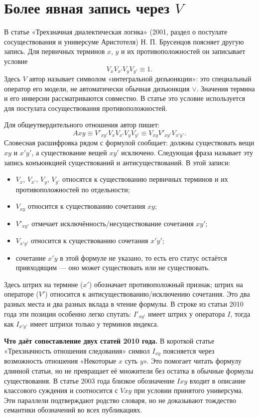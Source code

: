 \documentclass[12pt,a4paper]{article}
\begin{document}
\section{Более явная запись через $V$}

В статье «Трехзначная диалектическая логика» (2001, раздел о постулате сосуществования и универсуме Аристотеля) Н. П. Брусенцов поясняет другую запись. Для первичных терминов $x$, $y$ и их противоположностей он записывает условие
\[
V_x V_{x'} V_y V_{y'} \equiv 1.
\]
Здесь $V$ автор называет символом «интегральной дизъюнкции»: это специальный оператор его модели, не автоматически обычная дизъюнкция $\lor$. Значения термина и его инверсии рассматриваются совместно. В статье это условие используется для постулата сосуществования противоположностей.

Для общеутвердительного отношения автор пишет:
\[
Axy \equiv V'_{xy'} V_x V_{x'} V_y V_{y'}
\equiv V_{xy} V'_{xy'} V_{x'y'}.
\]
Словесная расшифровка рядом с формулой сообщает: должны существовать вещи $xy$ и $x'y'$, а существование вещей $xy'$ исключено. Следующая фраза называет эту запись конъюнкцией существований и антисуществований. В этой записи:

\begin{itemize}
\item $V_x$, $V_{x'}$, $V_y$, $V_{y'}$ относятся к существованию первичных терминов и их противоположностей по отдельности;
\item $V_{xy}$ относится к существованию сочетания $xy$;
\item $V'_{xy'}$ отмечает исключённость/несуществование сочетания $xy'$;
\item $V_{x'y'}$ относится к существованию сочетания $x'y'$;
\item сочетание $x'y$ в этой формуле не указано, то есть его статус остаётся привходящим — оно может существовать или не существовать.
\end{itemize}

Здесь штрих на термине ($x'$) обозначает противоположный признак; штрих на операторе ($V'$) относится к антисуществованию/исключению сочетания. Это два разных места и два разных вклада в чтение формулы. В строке из статьи 2010 года эти позиции особенно легко спутать: $I'_{xy'}$ имеет штрих у оператора $I$, тогда как $I_{x'y'}$ имеет штрихи только у терминов индекса.

\textbf{Что даёт сопоставление двух статей 2010 года.} В короткой статье «Трехзначность отношения следования» символ $I_{xy}$ поясняется через возможность отношения «Некоторые $x$ суть $y$». Это помогает читать формулу длинной статьи, но не превращает её множители без остатка в обычные формулы существования. В статье 2003 года близкое обозначение $Ixy$ входит в описание классового суждения и соотносится с $Vxy$ при условии принятого универсума. Эти параллели подтверждают родство словаря, но не доказывают тождество семантики обозначений во всех публикациях.
\end{document}
